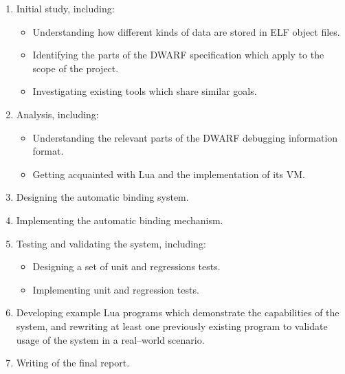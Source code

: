 \begin{enumerate}
	\item Initial study, including:
		\begin{itemize}
			\item Understanding how different kinds of data are stored in \gls{ELF}
				object files.
			\item Identifying the parts of the \gls{DWARF} specification which apply
				to the scope of the project.
			\item Investigating existing tools which share similar goals.
		\end{itemize}

	\item Analysis, including:
		\begin{itemize}
			\item Understanding the relevant parts of the \gls{DWARF}
				debugging information format.
			\item Getting acquainted with Lua and the implementation
				of its \gls{VM}.
		\end{itemize}

	\item Designing the automatic binding system.

	\item Implementing the automatic binding mechanism.

	\item Testing and validating the system, including:
		\begin{itemize}
			\item Designing a set of unit and regressions tests.
			\item Implementing unit and regression tests.
		\end{itemize}

	\item Developing example Lua programs which demonstrate the capabilities of
		the system, and rewriting at least one previously existing program to
		validate usage of the system in a real--world scenario.

	\item Writing of the final report.
\end{enumerate}


